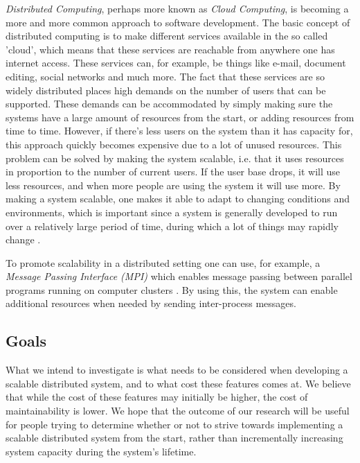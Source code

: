 \documentclass{article}
\begin{document}
\emph{Distributed Computing}, perhaps more known as \emph{Cloud Computing}, is becoming a
more and more common approach to software development. The basic concept of
distributed computing is to make different services available in the so called
'cloud', which means that these services are reachable from anywhere one has
internet access. These services can, for example, be things like e-mail,
document editing, social networks and much more. The fact that these services
are so widely distributed places high demands on the number of users that can
be supported. These demands can be accommodated by simply making sure the
systems have a large amount of resources from the start, or adding resources
from time to time. However, if there's less users on the system than it has
capacity for, this approach quickly becomes expensive due to a lot of unused
resources. This problem can be solved by making the system scalable, i.e. that
it uses resources in proportion to the number of current users. If the user
base drops, it will use less resources, and when more people are using the
system it will use more. By making a system scalable, one makes it able to
adapt to changing conditions and environments, which is important since a
system is generally developed to run over a relatively large period of time,
during which a lot of things may rapidly change \cite{van1998software}
\cite{caruso1997toward}.

To promote scalability in a distributed setting one can use, for example, a
\emph{Message Passing Interface (MPI)} which enables message passing between
parallel programs running on computer clusters \cite{gropp1996high}. By using
this, the system can enable additional resources when needed by sending
inter-process messages.
 
\subsection{Goals} 

What we intend to investigate is what needs to be considered
when developing a scalable distributed system, and to what cost these features
comes at. We believe that while the cost of these features may initially be
higher, the cost of maintainability is lower. We hope that the outcome of our
research will be useful for people trying to determine whether or not to strive
towards implementing a scalable distributed system from the start, rather than
incrementally increasing system capacity during the system's lifetime.
\end{document}
